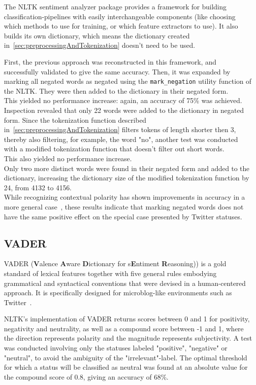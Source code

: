 The NLTK sentiment analyzer package provides a framework for building classification-pipelines with easily interchangeable components
(like choosing which methods to use for training, or which feature extractors to use).
It also builds its own dictionary, which means the dictionary created in~\autoref{sec:preprocessingAndTokenization} doesn't need to be used.
\par
First, the previous approach was reconstructed in this framework, and successfully validated to give the same accuracy.
Then, it was expanded by marking all negated words as negated using the \texttt{mark\_negation} utility function of the NLTK.
They were then added to the dictionary in their negated form.
\\
This yielded no performance increase: again, an accuracy of 75\% was achieved.
\\
Inspection revealed that only 22 words were added to the dictionary in negated form.
Since the tokenization function described in~\autoref{sec:preprocessingAndTokenization} filters tokens of length shorter then 3,
thereby also filtering, for example, the word "no", another test was conducted with a modified tokenization function that doesn't filter out short words.
\\
This also yielded no performance increase.
\\
Only two more distinct words were found in their negated form and added to the dictionary,
increasing the dictionary size of the modified tokenization function by 24, from 4132 to 4156.
\\
While recognizing contextual polarity has shown improvements in accuracy in a more general case~\cite{Hoffmann2005},
these results indicate that marking negated words does not have the same positive effect on the special case presented by Twitter statuses.

\subsection{VADER}
\label{subsec:vader}

VADER (\textbf{V}alence \textbf{A}ware \textbf{D}ictionary for s\textbf{E}ntiment \textbf{R}easoning))
is a gold standard of lexical features together with five general rules embodying grammatical and syntactical conventions
that were devised in a human-centered approach.
It is specifically designed for microblog-like environments such as Twitter~\cite{Hutto2014}.
\par
NLTK's implementation of VADER returns scores between 0 and 1 for positivity, negativity and neutrality,
as well as a compound score between -1 and 1, where the direction represents polarity and the magnitude represents subjectivity.
A test was conducted involving only the statuses labeled "positive", "negative" or "neutral",
to avoid the ambiguity of the "irrelevant"-label.
The optimal threshold for which a status will be classified as neutral was found
at an absolute value for the compound score of 0.8, giving an accuracy of 68\%.

